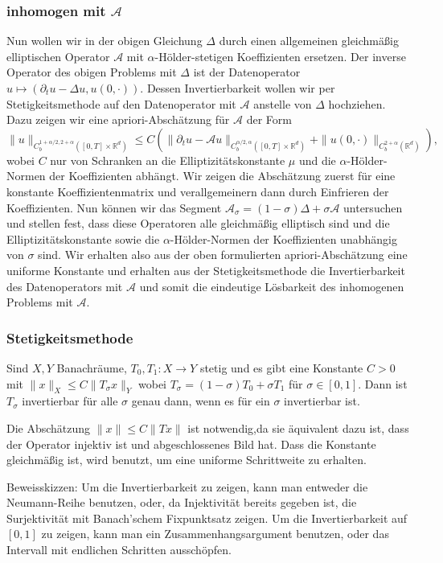 \documentclass[11pt,a4paper]{scrartcl}
\newcommand{\R}{\mathbb{R}} %
\newcommand{\A}{\mathcal{A}}
\theoremstyle{plain}
\theoremstyle{definition}
\theoremstyle{remark}
\begin{document}
\subsubsection{inhomogen mit $\A$}

Nun wollen wir in der obigen Gleichung $\Delta$ durch einen allgemeinen gleichmäßig elliptischen Operator $\A$ mit $\alpha$-Hölder-stetigen Koeffizienten ersetzen. Der inverse Operator des obigen Problems mit $\Delta$ ist der Datenoperator $u\mapsto (\partial_t u - \Delta u, u(0,\cdot))$. Dessen Invertierbarkeit wollen wir per Stetigkeitsmethode auf den Datenoperator mit $\A$ anstelle von $\Delta$ hochziehen. Dazu zeigen wir eine apriori-Abschätzung für $\A$ der Form $$\|u\|_{C_b^{1+\alpha/2,2+\alpha}([0,T]\times \R^d)} \leq C \left( \|\partial_t u - \A u\|_{C_b^{\alpha/2,\alpha}([0,T]\times \R^d)} + \|u(0,\cdot)\|_{C_b^{2+\alpha}(\R^d)} \right),$$ wobei $C$ nur von Schranken an die Elliptizitätskonstante $\mu$ und die $\alpha$-Hölder-Normen der Koeffizienten abhängt. Wir zeigen die Abschätzung zuerst für eine konstante Koeffizientenmatrix und verallgemeinern dann durch Einfrieren der Koeffizienten. Nun können wir das Segment $\A_\sigma = (1-\sigma)\Delta + \sigma \A$ untersuchen und stellen fest, dass diese Operatoren alle gleichmäßig elliptisch sind und die Elliptizitätskonstante sowie die $\alpha$-Hölder-Normen der Koeffizienten unabhängig von $\sigma$ sind. Wir erhalten also aus der oben formulierten apriori-Abschätzung eine uniforme Konstante und erhalten aus der Stetigkeitsmethode die Invertierbarkeit des Datenoperators mit $\A$ und somit die eindeutige Lösbarkeit des inhomogenen Problems mit $\A$.

\subsubsection{Stetigkeitsmethode}

Sind $X,Y$ Banachräume, $T_0,T_1:X\to Y$ stetig und es gibt eine Konstante $C>0$ mit $\|x\|_X \leq C \|T_\sigma x\|_Y$ wobei $T_\sigma = (1-\sigma) T_0 + \sigma T_1$ für $\sigma\in [0,1]$. Dann ist $T_\sigma$ invertierbar für alle $\sigma$ genau dann, wenn es für ein $\sigma$ invertierbar ist.

Die Abschätzung $\|x\|\leq C\|Tx\|$ ist notwendig,da sie äquivalent dazu ist, dass der Operator injektiv ist und abgeschlossenes Bild hat. Dass die Konstante gleichmäßig ist, wird benutzt, um eine uniforme Schrittweite zu erhalten.

Beweisskizzen: Um die Invertierbarkeit zu zeigen, kann man entweder die Neumann-Reihe benutzen, oder, da Injektivität bereits gegeben ist, die Surjektivität mit Banach'schem Fixpunktsatz zeigen. Um die Invertierbarkeit auf $[0,1]$ zu zeigen, kann man ein Zusammenhangsargument benutzen, oder das Intervall mit endlichen Schritten ausschöpfen.
\end{document}
